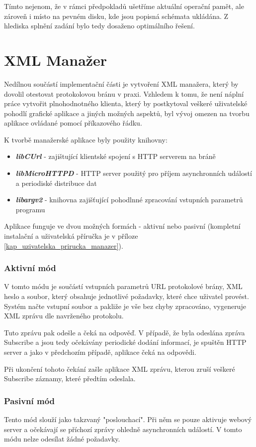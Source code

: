 Tímto nejenom, že v rámci předpokladů ušetříme aktuální operační pamět, ale zároveň i místo na pevném disku, kde jsou popisná schémata ukládána. Z hlediska splnění zadání bylo tedy
dosaženo optimálního řešení.


\section{XML Manažer}
Nedílnou součástí implementační části je vytvoření XML manažera, který by dovolil otestovat protokolovou bránu v praxi. Vzhledem k tomu, že není náplní práce vytvořit plnohodnotného
klienta, který by postkytoval veškeré uživatelské pohodlí grafické aplikace a jiných možných aspektů, byl vývoj omezen na tvorbu aplikace ovládané pomocí příkazového řádku.

K tvorbě manažerské aplikace byly použity knihovny:
\begin{itemize}
	\item \textbf{ \textit{libCUrl} } - zajištující klientské spojení s HTTP serverem na bráně
	\item \textbf{ \textit{libMicroHTTPD} } - HTTP server použitý pro příjem asynchronních událostí a periodiské distribuce dat
	\item \textbf{ \textit{libargv2} } - knihovna zajišťující pohodlnné zpracování vstupních parametrů programu
\end{itemize}

Aplikace funguje ve dvou možných formách - aktivní nebo pasivní (kompletní instalační a uživatelská příručka je v příloze \ref{kap_uzivatelska_prirucka_manazer}).

\subsubsection*{Aktivní mód}
V tomto módu je součástí vstupních parametrů URL protokolové brány, XML heslo a soubor, který obsahuje jednotlivé požadavky, které chce
uživatel provést. Systém načte vstupní soubor a pakliže je vše bez chyby zpracováno, vygeneruje XML zprávu dle navrženého protokolu. 

Tuto zprávu pak odešle a čeká na odpověď. V případě, že byla odeslána zpráva Subscribe a jsou tedy očekávány periodické dodání informací,
je spuštěn HTTP server a jako v předchozím případě, aplikace čeká na odpovědi.

Při ukončení tohoto čekání zašle aplikace XML zprávu, kterou zruší veškeré Subscribe záznamy, které předtím odeslala.

\subsubsection*{Pasivní mód}
Tento mód slouží jako takzvaný "poslouchací". Při něm se pouze aktivuje webový server a očekávají se příchozí zprávy ohledně asynchronních událostí.
V tomto módu nelze odesílat žádné požadavky.
